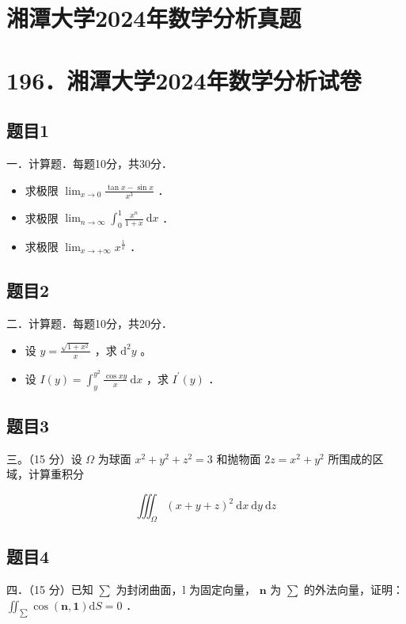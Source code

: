 \documentclass{article}
\begin{document}
\section*{湘潭大学2024年数学分析真题}
\section*{196．湘潭大学2024年数学分析试卷}

\subsection{题目1}
一．计算题．每题10分，共30分．

\begin{itemize}
  \item[（1）] 求极限 \(\lim _{x \rightarrow 0} \frac{\tan x-\sin x}{x^{3}}\) ．
  \item[（2）] 求极限 \(\lim _{n \rightarrow \infty} \int_{0}^{1} \frac{x^{n}}{1+x} \mathrm{~d} x\) ．
  \item[（3）] 求极限 \(\lim _{x \rightarrow+\infty} x^{\frac{1}{x}}\) ．
\end{itemize}

\subsection{题目2}
二．计算题．每题10分，共20分．

\begin{itemize}
  \item[（1）] 设 \(y=\frac{\sqrt{1+x^{2}}}{x}\) ，求 \(\mathrm{d}^{2} y\) 。
  \item[（2）] 设 \(I(y)=\int_{y}^{y^{2}} \frac{\cos x y}{x} \mathrm{~d} x\) ，求 \(I^{\prime}(y)\) ．
\end{itemize}

\subsection{题目3}
三。（15 分）设 \(\Omega\) 为球面 \(x^{2}+y^{2}+z^{2}=3\) 和抛物面 \(2 z=x^{2}+y^{2}\) 所围成的区域，计算重积分

\[
\iiint_{\Omega}(x+y+z)^{2} \mathrm{~d} x \mathrm{~d} y \mathrm{~d} z
\]

\subsection{题目4}
四．（15 分）已知 \(\sum\) 为封闭曲面，l 为固定向量， \(\mathbf{n}\) 为 \(\sum\) 的外法向量，证明： \(\iint_{\sum} \cos (\mathbf{n}, \mathbf{1}) \mathrm{d} S=0\) ．
\end{document}
